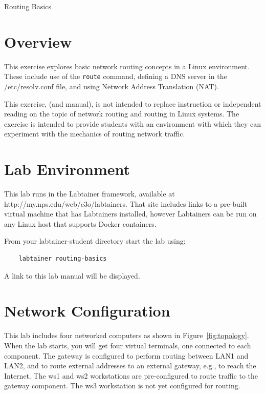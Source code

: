 


\begin{center}
{\LARGE Routing Basics}
\vspace{0.1in}\\
\end{center}

\copyrightnotice

\section{Overview}
This exercise explores basic network routing concepts
in a Linux environment.  These include use of the \texttt{route}
command, defining a DNS server in the /etc/resolv.conf file,
and using Network Address Translation (NAT).

This exercise, (and manual), is not intended to replace instruction
or independent reading on the topic of network routing and
routing in Linux systems. The exercise is intended to provide
students with an environment with which they can experiment
with the mechanics of routing network traffic.


\section{Lab Environment}
This lab runs in the Labtainer framework,
available at http://my.nps.edu/web/c3o/labtainers.
That site includes links to a pre-built virtual machine
that has Labtainers installed, however Labtainers can
be run on any Linux host that supports Docker containers.

From your labtainer-student directory start the lab using:
\begin{verbatim}
    labtainer routing-basics
\end{verbatim}
\noindent A link to this lab manual will be displayed.

\section{Network Configuration}
This lab includes four networked computers as shown in Figure~\ref{fig:topology}.
When the lab starts, you will get four virtual terminals, one connected to each
component.
The gateway is configured to perform routing between LAN1 and LAN2, and to
route external addresses to an external gateway, e.g., to reach the Internet.
The ws1 and ws2 workstations are pre-configured to route traffic to the gateway
component.  The ws3 workstation is not yet configured for routing.

